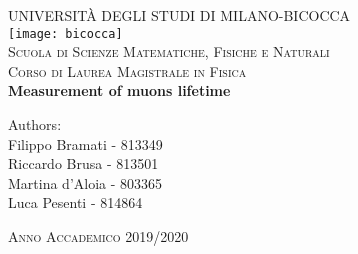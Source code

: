 \thispagestyle{empty}
	\begin{center}
	{\large\scshape {UNIVERSIT\`{A} DEGLI STUDI DI MILANO-BICOCCA}}\\
	\medskip
	\medskip
	\medskip
	\medskip
	\medskip
	\medskip
	\medskip
	\medskip
	\texttt{[image: bicocca]}\\
	\medskip
	\medskip
	\medskip
	\medskip
	\medskip
	\medskip
	{\large\scshape {Scuola di Scienze Matematiche, Fisiche e Naturali}}\\
	\medskip
	\medskip
	{\large \scshape{Corso di Laurea Magistrale in Fisica}}\\
	\medskip
	\medskip
	\medskip
	\medskip
	\medskip
	\medskip
	\medskip
	\medskip
	\medskip
	\medskip
	\Huge \textbf{Measurement of muons lifetime}
	\end{center}
	\medskip
	\medskip
	\medskip
	\medskip
	\medskip
	\medskip
	\medskip
	\medskip
	\medskip
	\medskip
	\medskip
	\medskip
	\medskip
	\medskip
	\medskip
	
	\noindent Authors:\\
	
	\noindent Filippo Bramati - 813349\\
	Riccardo Brusa - 813501\\
	Martina d'Aloia - 803365\\
	Luca Pesenti - 814864\\
	

	
	
	\medskip
	\medskip
	\medskip
	\medskip
	\medskip
	\medskip
	\medskip
	\medskip
	\begin{center}
		\scshape{Anno Accademico 2019/2020}
	\end{center}
